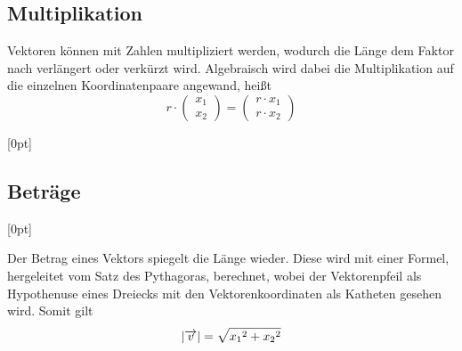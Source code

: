 \documentclass{article}
\begin{document}
\subsection{Multiplikation}
\begin{minipage}{\dimexpr\textwidth-4cm} 
Vektoren können mit Zahlen multipliziert werden, wodurch die Länge dem Faktor nach verlängert oder verkürzt wird. Algebraisch wird dabei die Multiplikation auf die einzelnen Koordinatenpaare angewand, heißt
\[ 
 r \cdot
 \begin{pmatrix} x_1 \\ x_2 \end{pmatrix} =
 \begin{pmatrix} r \cdot x_1 \\ r \cdot x_2 \end{pmatrix} 
\]
\end{minipage}
\hfill
\begin{minipage}{4cm}
  \centering
  \raisebox{-2cm}[0pt]{
  } 
 
\end{minipage} 
 
\subsection{Beträge}
\begin{minipage}{4cm}
  \centering
  \raisebox{-1.7cm}[0pt]{
  }
\end{minipage}
\hfill
\begin{minipage}{\dimexpr\textwidth-4cm}  
Der Betrag eines Vektors spiegelt die Länge wieder. Diese wird mit einer Formel, hergeleitet vom Satz des Pythagoras, berechnet, wobei der Vektorenpfeil als Hypothenuse eines Dreiecks mit den Vektorenkoordinaten als Katheten gesehen wird. Somit gilt
\[
 \left| {\overrightarrow{v}} \right| =
 \sqrt{{x_1}^2 + {x_2}^2}
\]
\end{minipage} 
 
\end{document}
